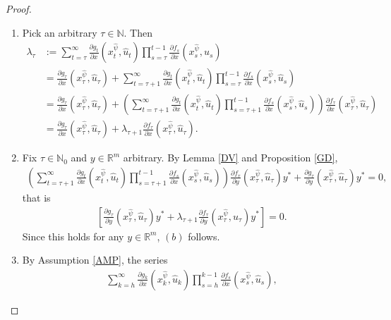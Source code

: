 \documentclass[10pt,a4paper]{amsart}
\newcommand{\natu}{\mathbb N}
\newcommand{\nat}{\mathbb N_0}
\newcommand{\rzm}{\mathbb R^{m}}
\begin{document}
	\begin{proof}
		
		\begin{enumerate}
			\item[(a)] Pick an arbitrary $\tau\in\natu$. Then
			\begin{align*}
			\lambda_\tau&:=\sum_{t=\tau}^\infty\frac{\partial g_t}{\partial x}(x_t^{\hat{\psi}},\hat u_t)\prod_{s=\tau}^{t-1}\frac{\partial f_s}{\partial x}(x_s^{\hat{\psi}},\hat u_s)\\
			&=\frac{\partial g_\tau}{\partial x}(x_\tau^{\hat{\psi}},\hat u_\tau)+\sum_{t=\tau+1}^\infty\frac{\partial g_t}{\partial x}(x_t^{\hat{\psi}},\hat u_t)\prod_{s=\tau}^{t-1}\frac{\partial f_s}{\partial x}(x_s^{\hat{\psi}},\hat u_s)\\
			&=\frac{\partial g_\tau}{\partial x}(x_\tau^{\hat{\psi}},\hat u_\tau)+\left( \sum_{t=\tau+1}^\infty\frac{\partial g_t}{\partial x}(x_t^{\hat{\psi}},\hat u_t)\prod_{s=\tau+1}^{t-1}\frac{\partial f_s}{\partial x}(x_s^{\hat{\psi}},\hat u_s)\right)\frac{\partial f_\tau}{\partial x}(x_\tau^{\hat{\psi}},\hat u_\tau)\\
			&=\frac{\partial g_\tau}{\partial x}(x_\tau^{\hat{\psi}},\hat u_\tau)+\lambda_{\tau+1}\frac{\partial f_\tau}{\partial x}(x_\tau^{\hat{\psi}},\hat u_\tau).
			\end{align*}
			\item[(b)] Fix $\tau\in\nat$ and $y\in\rzm$ arbitrary. By Lemma \ref{DV} and Proposition \ref{GD},
			\begin{align*}
			\left( \sum_{t=\tau+1}^\infty\frac{\partial g_t}{\partial x}(x_t^{\hat{\psi}},\hat u_t)\prod_{s=\tau+1}^{t-1}\frac{\partial f_s}{\partial x}(x_s^{\hat{\psi}},\hat u_s)\right)\frac{\partial f_\tau}{\partial y}(x_\tau^{\hat{\psi}},\hat u_\tau)y^*+\frac{\partial g_\tau}{\partial y}(x_\tau^{\hat{\psi}},\hat u_\tau)y^*=0,
			\end{align*}
			that is 
			\begin{align*}
			\left[\frac{\partial g_\tau}{\partial y}(x_\tau^{\hat{\psi}},\hat u_\tau)y^*+\lambda_{\tau+1}\frac{\partial f_\tau}{\partial y}(x_\tau^{\hat{\psi}},\hat u_\tau)y^*\right]=0.
			\end{align*}
			Since this holds for any $y\in\rzm$, $(b)$ follows.
			\item[(c)] By Assumption \ref{AMP}, the series
			\begin{align*}
			\sum_{k=h}^\infty\frac{\partial g_k}{\partial x}(x_k^{\hat{\psi}},\hat u_k)\prod_{s=h}^{k-1}\frac{\partial f_s}{\partial x}(x_s^{\hat{\psi}},\hat u_s),

\end{align*}
\end{enumerate}
\end{proof}
\end{document}
